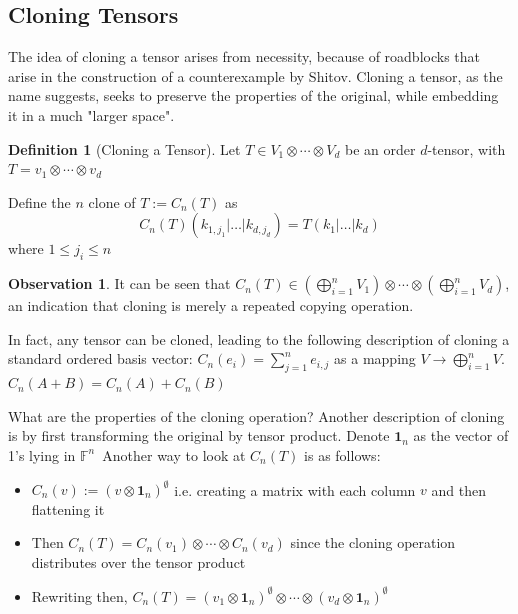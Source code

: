 \documentclass[12pt,a4paper,oneside]{book}
\theoremstyle{definition}
\newtheorem{definition}{Definition}[section]
\newtheorem*{observation}{Observation}
\begin{document}
\subsection{Cloning Tensors}\label{subsection:tensorcloning}
The idea of cloning a tensor arises from necessity, because of roadblocks that arise in the construction of a counterexample by Shitov. Cloning a tensor, as the name suggests, seeks to preserve the properties of the original, while embedding it in a much "larger space".
\begin{definition}[Cloning a Tensor]\label{defn:tensorcloning}
    Let $T \in V_1 \otimes \cdots \otimes V_d$ be an order $d$-tensor, with $T = v_1 \otimes \cdots \otimes v_d$

    Define the $n$ clone of $T:= C_n(T)$ as $$C_n(T)(k_{1, j_1} | \ldots | k_{d, j_d}) = T(k_1 | \ldots | k_d)$$where $1 \leq j_i \leq n$
\end{definition}
\begin{observation}
    It can be seen that $C_n(T) \in \left(\bigoplus_{i=1}^n V_1\right) \otimes \cdots \otimes \left(\bigoplus_{i=1}^n V_d\right)$, an indication that cloning is merely a repeated copying operation.

    In fact, any tensor can be cloned, leading to the following description of cloning a standard ordered basis vector: $C_n(e_i) = \sum_{j=1}^{n} e_{i,j}$ as a mapping $V \to \bigoplus_{i=1}^n V$. \\
    $C_n(A + B) = C_n(A) + C_n(B)$ 
\end{observation} 
What are the properties of the cloning operation? 
Another description of cloning is by first transforming the original by tensor product.	Denote $\mathbf{1}_n$ as the vector of 1's lying in $\mathbb{F}^n$\ Another way to look at $C_n(T)$ is as follows: 
\begin{itemize}
    \item $C_n(v) := (v \otimes \mathbf{1}_n)^{\emptyset}$ i.e. creating a matrix with each column $v$ and then flattening it
    \item Then $C_n(T) = C_n(v_1) \otimes \cdots \otimes C_n(v_d)$ since the cloning operation distributes over the tensor product
    \item Rewriting then, $C_n(T) = (v_1 \otimes \mathbf{1}_n)^{\emptyset} \otimes \cdots \otimes (v_d \otimes \mathbf{1}_n)^{\emptyset}$ 
\end{itemize}
\end{document}
